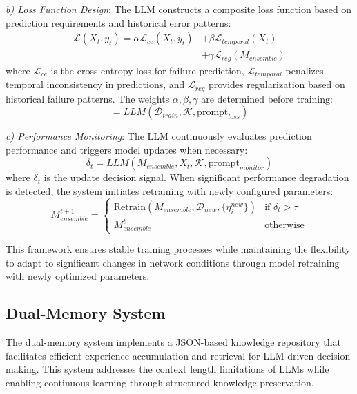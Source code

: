 \documentclass[conference]{IEEEtran}
\begin{document}
\textit{b) Loss Function Design}: The LLM constructs a composite loss function based on prediction requirements and historical error patterns:
\begin{equation}
    \begin{aligned} 
    \mathcal{L}(X_t, y_t) = \alpha\mathcal{L}_{ce}(X_t, y_t) &+ \beta\mathcal{L}_{temporal}(X_t) \\
    &+ \gamma\mathcal{L}_{reg}(M_{ensemble})
    \end{aligned}
\end{equation}
where $\mathcal{L}_{ce}$ is the cross-entropy loss for failure prediction, $\mathcal{L}_{temporal}$ penalizes temporal inconsistency in predictions, and $\mathcal{L}_{reg}$ provides regularization based on historical failure patterns. The weights $\alpha, \beta, \gamma$ are determined before training:
\begin{equation}
    [\alpha, \beta, \gamma] = LLM(\mathcal{D}_{train}, \mathcal{K}, \text{prompt}_{loss})
\end{equation}

\textit{c) Performance Monitoring}: The LLM continuously evaluates prediction performance and triggers model updates when necessary:
\begin{equation}
    \delta_t = LLM(M_{ensemble}, X_t, \mathcal{K}, \text{prompt}_{monitor})
\end{equation}
where $\delta_t$ is the update decision signal. When significant performance degradation is detected, the system initiates retraining with newly configured parameters:
\begin{equation}
    M_{ensemble}^{t+1} = \begin{cases}
        \text{Retrain}(M_{ensemble}, \mathcal{D}_{new}, \{\eta_i^{new}\}) & \text{if } \delta_t > \tau \\
        M_{ensemble}^t & \text{otherwise}
    \end{cases}
\end{equation}

This framework ensures stable training processes while maintaining the flexibility to adapt to significant changes in network conditions through model retraining with newly optimized parameters.

\subsection{Dual-Memory System}
The dual-memory system implements a JSON-based knowledge repository that facilitates efficient experience accumulation and retrieval for LLM-driven decision making. This system addresses the context length limitations of LLMs while enabling continuous learning through structured knowledge preservation.
\end{document}
